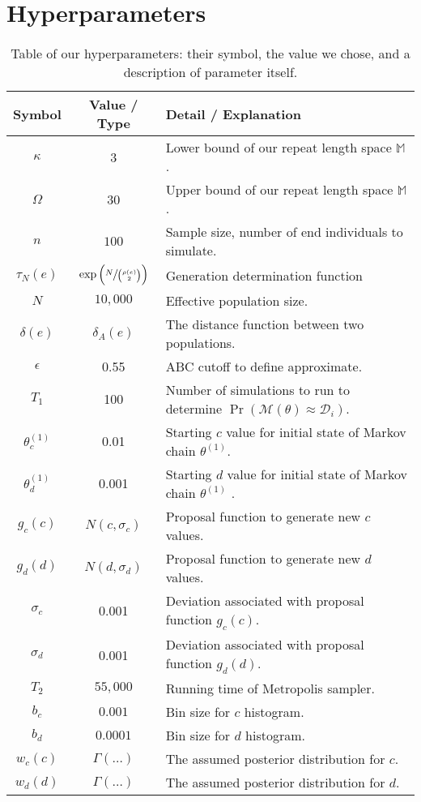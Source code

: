 \section{Hyperparameters}\label{sec:hyperparameters}
\begin{table}
    \begin{tabu} to \textwidth {|c|c|X|}
       \toprule
        Symbol & Value / Type & Detail / Explanation \\
        \hline
        $\kappa$ & 3 & Lower bound of our repeat length space $\mathbb{M}$. \\
        $\Omega$ & 30 & Upper bound of our repeat length space $\mathbb{M}$. \\
        $n$ & $100$ & Sample size, number of end individuals to simulate. \\
        $\tau_N(e)$ & $\exp\left(\sfrac{N}{\binom{\rho(e)}{2}}\right)$ & Generation determination function\\
        $N$ & $10,000$ & Effective population size. \\
        $\delta(e)$ & $\delta_A(e)$ & The distance function between two populations. \\
        $\epsilon$ & 0.55 & ABC cutoff to define approximate. \\
        $T_1$ & 100 & Number of simulations to run to determine $\Pr(\mathcal{M}(\theta) \approx \mathcal{D}_i)$. \\
        $\theta^{(1)}_c$ & 0.01 & Starting $c$ value for initial state of Markov chain $\theta^{(1)}$. \\
        $\theta^{(1)}_d$ & 0.001 & Starting $d$ value for initial state of Markov chain $\theta^{(1)}$ . \\
        $g_c(c)$ & $N(c, \sigma_c)$ & Proposal function to generate new $c$ values. \\
        $g_d(d)$ & $N(d, \sigma_d)$ & Proposal function to generate new $d$ values. \\
        $\sigma_c$ & 0.001 & Deviation associated with proposal function $g_c(c)$. \\
        $\sigma_d$ & 0.001 & Deviation associated with proposal function $g_d(d)$. \\
        $T_2$ & $55,000$ & Running time of Metropolis sampler. \\
        $b_c$ & $0.001$ & Bin size for $c$ histogram. \\
        $b_d$ & $0.0001$ & Bin size for $d$ histogram. \\
        $w_c(c)$ & $\Gamma(\ldots)$ & The assumed posterior distribution for $c$. \\
        $w_d(d)$ & $\Gamma(\ldots)$ & The assumed posterior distribution for $d$. \\
       \bottomrule
    \end{tabu}
    \caption{Table of our hyperparameters: their symbol, the value we chose, and a description of parameter itself.
    }\label{tab:hyperparameters}
\end{table}

